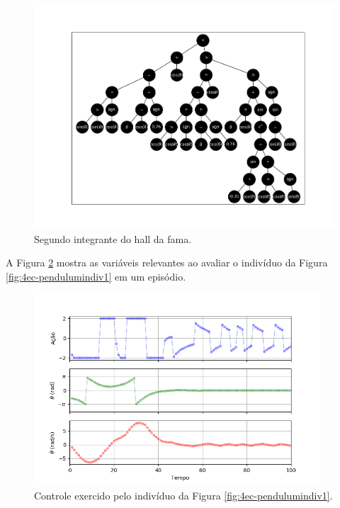 \begin{figure}[H]
	\centering
	\includegraphics[width=\textwidth]{02_desenvolvimento/04_EC_Fig_PendulumIndiv2.png}
	\caption{Segundo integrante do hall da fama.}
	\label{fig:4ec-pendulumindiv2}
\end{figure}

A Figura \ref{fig:4ec-pendulumgraficosaval} mostra as variáveis relevantes ao avaliar o indivíduo da Figura \ref{fig:4ec-pendulumindiv1} em um episódio. 

\begin{figure}[H]
	\centering
	\includegraphics[width=0.95\textwidth]{02_desenvolvimento/04_EC_Fig_PendulumGraficosAval.png}
	\caption{Controle exercido pelo indivíduo da Figura \ref{fig:4ec-pendulumindiv1}.}
	\label{fig:4ec-pendulumgraficosaval}
\end{figure}

